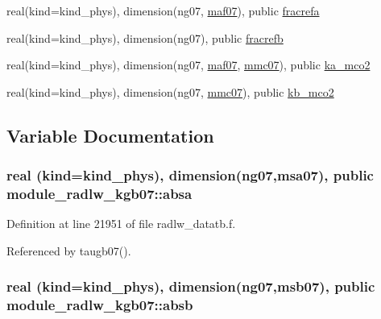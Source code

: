 \begin{DoxyCompactItemize}
\item 
real(kind=kind\+\_\+phys), dimension(ng07, \hyperlink{namespacemodule__radlw__kgb07_a21ac454fe21fb07ee555b4106121b2ae}{maf07}), public \hyperlink{namespacemodule__radlw__kgb07_a07f2a4a0f1152a65aed68623f14a9ae4}{fracrefa}
\item 
real(kind=kind\+\_\+phys), dimension(ng07), public \hyperlink{namespacemodule__radlw__kgb07_aa16eb60406e5a298e380b55af528791a}{fracrefb}
\item 
real(kind=kind\+\_\+phys), dimension(ng07, \hyperlink{namespacemodule__radlw__kgb07_a21ac454fe21fb07ee555b4106121b2ae}{maf07}, \hyperlink{namespacemodule__radlw__kgb07_a2d176bec938d9fdcc2369fda91308702}{mmc07}), public \hyperlink{namespacemodule__radlw__kgb07_a3fdad494f3d3fcf9306da6a81d97bd43}{ka\+\_\+mco2}
\item 
real(kind=kind\+\_\+phys), dimension(ng07, \hyperlink{namespacemodule__radlw__kgb07_a2d176bec938d9fdcc2369fda91308702}{mmc07}), public \hyperlink{namespacemodule__radlw__kgb07_a2dcfbe76332d559cda48c7ba065ab349}{kb\+\_\+mco2}
\end{DoxyCompactItemize}


\subsection{Variable Documentation}
\subsubsection[{\texorpdfstring{absa}{absa}}]{\setlength{\rightskip}{0pt plus 5cm}real (kind=kind\+\_\+phys), dimension(ng07,{\bf msa07}), public module\+\_\+radlw\+\_\+kgb07\+::absa}\hypertarget{namespacemodule__radlw__kgb07_af106cf054f7496a092ceb0c399753a36}{}\label{namespacemodule__radlw__kgb07_af106cf054f7496a092ceb0c399753a36}


Definition at line 21951 of file radlw\+\_\+datatb.\+f.



Referenced by taugb07().

\subsubsection[{\texorpdfstring{absb}{absb}}]{\setlength{\rightskip}{0pt plus 5cm}real (kind=kind\+\_\+phys), dimension(ng07,{\bf msb07}), public module\+\_\+radlw\+\_\+kgb07\+::absb}\hypertarget{namespacemodule__radlw__kgb07_ab0478438e9bbe64401aa492510f8d4bb}{}\label{namespacemodule__radlw__kgb07_ab0478438e9bbe64401aa492510f8d4bb}



